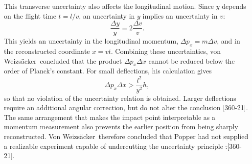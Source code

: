 \documentclass[pdflatex]{sn-jnl}
\newcommand{\vW}{von Weizsäcker\xspace}
\newcommand{\VW}{Von Weizsäcker\xspace}
\providecommand{\DIFdel}[1]{{\protect\color{red}\sout{#1}}}                      %
\providecommand{\DIFdelbegin}{} %
\providecommand{\DIFdelend}{} %
\begin{document}
This transverse uncertainty also affects the longitudinal motion. Since $y$ depends on the flight time $t=l/v$, an uncertainty in $y$ implies an uncertainty in $v$:
\begin{equation*}
\frac{\Delta y}{y} = 2\frac{\Delta v}{v}.
\end{equation*}
%
This yields an uncertainty in the longitudinal momentum, $\Delta p_x=m\Delta v$, and in the reconstructed coordinate $x=vt$. Combining these uncertainties, \vW\ concluded that the product $\Delta p_x\Delta x$ cannot be reduced below the order of Planck's constant. For small deflections, his calculation gives
%
\begin{equation*}
\Delta p_x \Delta x > \frac{l^2}{y^2}h,
\end{equation*}
%
so that no violation of the uncertainty relation is obtained. Larger deflections require an additional angular correction, but do not alter the conclusion [360-21]. The same arrangement that makes the impact point interpretable as a momentum measurement also prevents the earlier position from being sharply reconstructed. \VW\ therefore concluded that Popper had not supplied a realizable experiment capable of undercutting the uncertainty principle \DIFdelbegin \DIFdel{.}\DIFdelend {}[360-21].

\DIFdelbegin %

\end{document}

